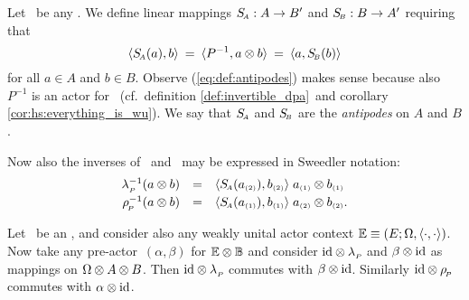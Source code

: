 \begin{defn_sec}  \label{def:antipode}
Let \pairAB\ be any \idpa\@. We define linear mappings $S_{\scriptscriptstyle \! A}: A\rightarrow B'$
and $S_{\scriptscriptstyle \! B}: B\rightarrow A'$ requiring that
\begin{equation}\label{eq:def:antipodes}
 \langle S_{\scriptscriptstyle \! A}(a),b \rangle \:=\: \langle P^{-1},a \otimes b \rangle \:=\: \langle a,S_{\scriptscriptstyle \! B}(b) \rangle
\end{equation}
for all $a \in A$ and $b \in B$.
Observe (\ref{eq:def:antipodes}) makes sense because also $P^{-1}$ is an actor for \BBAA\
(cf.\ definition \ref{def:invertible_dpa}\ and corollary \ref{cor:hs:everything_is_wu}).
We say that $S_{\scriptscriptstyle \! A}$ and $S_{\scriptscriptstyle \! B}$ are the {\em antipodes\/} on $A$ and $B$.
\end{defn_sec}



\begin{remark_sec} \label{rem:sweedler:inverses:lp:rp} \rm
Now also the inverses of \lp\ and \rp\ may be expressed in Sweedler notation:
$$\begin{array}{rcl}
     \lp^{-1}(a \tens b)  &=&        \pair{\SA(\sweed{a}{2})}{\sweed{b}{2}}
                                  \; \sweed{a}{1} \tens \sweed{b}{1}
     \\
     \rp^{-1}(a \tens b)  &=&  \pair{\SA(\sweed{a}{1})}{\sweed{b}{1}}
                                  \; \sweed{a}{2} \tens \sweed{b}{2}. \vertL
   \end{array} $$
\end{remark_sec}



\begin{lemma_sec} \label{lem:commutation:id_tens_lamP}
Let\/ \pairAB\ be an\/ \idpa, and consider also any weakly unital actor context\/
$\mathbb{E} \equiv (E; \Omega, \langle\cdot, \cdot\rangle)$.
Now take any \mbox{pre-actor}\ $(\alpha,\beta)$ for\/ $\mathbb{E} \otimes \mathbb{B}$
and consider\/ $\mbox{\rm id} \otimes \lambda_{_P\!}$ and\/ $\beta \otimes \mbox{\rm id}$ as mappings on\/
$\Omega \otimes A \otimes B$.
Then\/ $\mbox{\rm id} \otimes \lambda_{_P\!}$ commutes with\/ $\beta \otimes \mbox{\rm id}$.
Similarly\/ $\mbox{\rm id} \otimes \rho_{_{\!P}}$ commutes with\/ $\alpha \otimes \mbox{\rm id}$.
\end{lemma_sec}

